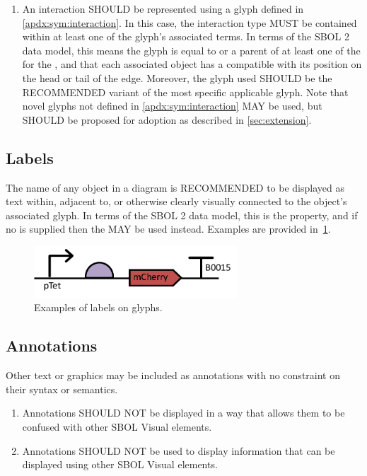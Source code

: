 \begin{enumerate}
\item An interaction SHOULD be represented using a glyph defined in \ref{apdx:sym:interaction}.  In this case, the interaction type MUST be contained within at least one of the glyph's associated terms.
In terms of the SBOL 2 data model, this means the glyph is equal to or a parent of at least one of the  for the , and that each associated  object has a  compatible with its position on the head or tail of the edge.
	Moreover, the glyph used SHOULD be the RECOMMENDED variant of the most specific applicable glyph.  Note that novel glyphs not defined in \ref{apdx:sym:interaction} MAY be used, but SHOULD be proposed for adoption as described in \ref{sec:extension}.
\end{enumerate}


\subsection{Labels}
The name of any object in a diagram is RECOMMENDED to be displayed as text within, adjacent to, or otherwise clearly visually connected to the object's associated glyph.  In terms of the SBOL 2 data model, this is the  property, and if no  is supplied then the  MAY be used instead.
Examples are provided in~\ref{exa:5}.

	\begin{figure}[h!]
	\centering
	\includegraphics[width=3in]{figures/examples/5-labels.pdf}
	\caption{Examples of labels on glyphs.}
	\label{exa:5}
	\end{figure}


\subsection{Annotations}
Other text or graphics may be included as annotations with no constraint on their syntax or semantics.

\begin{enumerate}
\item Annotations SHOULD NOT be displayed in a way that allows them to be confused with other SBOL Visual elements.
\item Annotations SHOULD NOT be used to display information that can be displayed using other SBOL Visual elements.
\end{enumerate}

